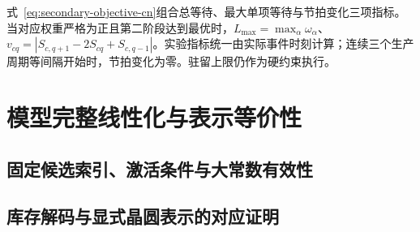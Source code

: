 式~\eqref{eq:secondary-objective-cn}组合总等待、最大单项等待与节拍变化三项指标。当对应权重严格为正且第二阶段达到最优时，$L_{\max}=\max_\alpha\omega_\alpha$、$v_{cq}=|S_{c,q+1}-2S_{cq}+S_{c,q-1}|$。实验指标统一由实际事件时刻计算；连续三个生产周期等间隔开始时，节拍变化为零。驻留上限仍作为硬约束执行。


\FloatBarrier
\section{模型完整线性化与表示等价性}
\subsection{固定候选索引、激活条件与大常数有效性}
\vspace*{3cm}
\subsection{库存解码与显式晶圆表示的对应证明}
\vspace*{3cm}
